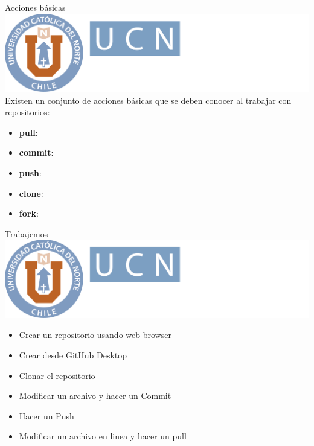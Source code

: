 \documentclass[12pt,a4paper,usenames,x11names,compress]{beamer}
\begin{document}
\begin{frame}{Acciones básicas \hfill \includegraphics[scale=.1]{eciem.png}}
Existen un conjunto de acciones básicas que se deben conocer al trabajar con repositorios:
\begin{itemize}
\justifying
\item \textbf{pull}:
\item \textbf{commit}:
\item \textbf{push}:
\item \textbf{clone}:
\item \textbf{fork}:
\end{itemize}
\end{frame}

\begin{frame}{Trabajemos \hfill \includegraphics[scale=.1]{eciem.png}}
\begin{itemize}
\item Crear un repositorio usando web browser
\item Crear desde GitHub Desktop
\item Clonar el repositorio
\item Modificar un archivo y hacer un Commit
\item Hacer un Push
\item Modificar un archivo en linea y hacer un pull
\end{itemize}
\end{frame}
\end{document}
